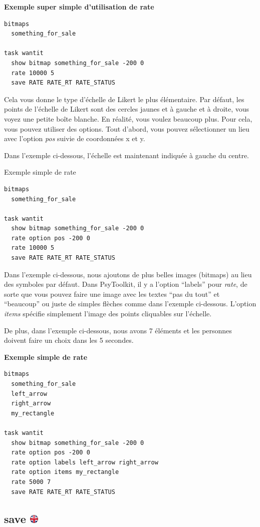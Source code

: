 \documentclass[
]{book}
\begin{document}
\textbf{Exemple super simple d'utilisation de rate}

\begin{verbatim}
bitmaps
  something_for_sale

task wantit
  show bitmap something_for_sale -200 0
  rate 10000 5
  save RATE RATE_RT RATE_STATUS
\end{verbatim}

Cela vous donne le type d'échelle de Likert le plus élémentaire. Par
défaut, les points de l'échelle de Likert sont des cercles jaunes et à
gauche et à droite, vous voyez une petite boîte blanche. En réalité,
vous voulez beaucoup plus. Pour cela, vous pouvez utiliser des options.
Tout d'abord, vous pouvez sélectionner un lieu avec l'option \emph{pos}
suivie de coordonnées x et y.

Dans l'exemple ci-dessous, l'échelle est maintenant indiquée à gauche du
centre.

Exemple simple de rate

\begin{verbatim}
bitmaps
  something_for_sale

task wantit
  show bitmap something_for_sale -200 0
  rate option pos -200 0
  rate 10000 5
  save RATE RATE_RT RATE_STATUS
\end{verbatim}

Dans l'exemple ci-dessous, nous ajoutons de plus belles images (bitmaps)
au lieu des symboles par défaut. Dans PsyToolkit, il y a l'option
``labels'' pour \emph{rate}, de sorte que vous pouvez faire une image
avec les textes ``pas du tout'' et ``beaucoup'' ou juste de simples
flèches comme dans l'exemple ci-dessous. L'option \emph{items} spécifie
simplement l'image des points cliquables sur l'échelle.

De plus, dans l'exemple ci-dessous, nous avons 7 éléments et les
personnes doivent faire un choix dans les 5 secondes.

\textbf{Exemple simple de rate}

\begin{verbatim}
bitmaps
  something_for_sale
  left_arrow
  right_arrow
  my_rectangle

task wantit
  show bitmap something_for_sale -200 0
  rate option pos -200 0
  rate option labels left_arrow right_arrow
  rate option items my_rectangle
  rate 5000 7
  save RATE RATE_RT RATE_STATUS
\end{verbatim}

\hypertarget{save}{%
\subsection[save ]{\texorpdfstring{save
\href{https://www.psytoolkit.org/doc3.2.0/syntax.html\#task-save}{\protect\includegraphics{img/ukflag.png}}}{save }}\label{save}}
\end{document}
